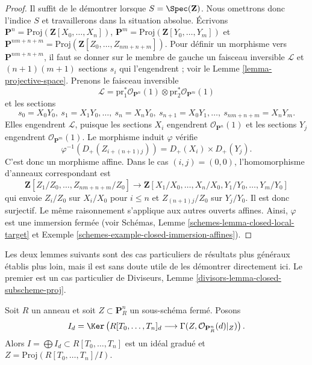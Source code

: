 \begin{proof}
Il suffit de le démontrer lorsque $S = \Spec(\mathbf{Z})$. Nous omettrons donc
l'indice $S$ et travaillerons dans la situation absolue. Écrivons
$\mathbf{P}^n = \text{Proj}(\mathbf{Z}[X_0, \ldots, X_n])$,
$\mathbf{P}^m = \text{Proj}(\mathbf{Z}[Y_0, \ldots, Y_m])$ et
$\mathbf{P}^{nm + n + m} =
\text{Proj}(\mathbf{Z}[Z_0, \ldots, Z_{nm + n + m}])$.
Pour définir un morphisme vers $\mathbf{P}^{nm + n + m}$, il faut se donner
sur le membre de gauche un faisceau inversible $\mathcal{L}$ et
$(n + 1)(m + 1)$ sections $s_i$ qui l'engendrent ; voir le
Lemme \ref{lemma-projective-space}. Prenons le faisceau inversible
$$
\mathcal{L} =
\text{pr}_1^*\mathcal{O}_{\mathbf{P}^n}(1)
\otimes
\text{pr}_2^*\mathcal{O}_{\mathbf{P}^m}(1)
$$
et les sections
$$
s_0 = X_0Y_0, \ s_1 = X_1Y_0, \ldots, \ s_n = X_nY_0,
\ s_{n + 1} = X_0Y_1, \ldots, \ s_{nm + n + m} = X_nY_m.
$$
Elles engendrent $\mathcal{L}$, puisque les sections $X_i$ engendrent
$\mathcal{O}_{\mathbf{P}^n}(1)$ et les sections $Y_j$ engendrent
$\mathcal{O}_{\mathbf{P}^m}(1)$. Le morphisme induit $\varphi$ vérifie
$$
\varphi^{-1}(D_{+}(Z_{i + (n + 1)j})) = D_{+}(X_i) \times D_{+}(Y_j).
$$
C'est donc un morphisme affine. Dans le cas $(i, j) = (0, 0)$,
l'homomorphisme d'anneaux correspondant est
$$
\mathbf{Z}[Z_1/Z_0, \ldots, Z_{nm + n + m}/Z_0]
\longrightarrow
\mathbf{Z}[X_1/X_0, \ldots, X_n/X_0, Y_1/Y_0, \ldots, Y_m/Y_0]
$$
qui envoie $Z_i/Z_0$ sur $X_i/X_0$ pour $i \leq n$ et
$Z_{(n + 1)j}/Z_0$ sur $Y_j/Y_0$. Il est donc surjectif. Le même raisonnement
s'applique aux autres ouverts affines. Ainsi, $\varphi$ est une immersion
fermée (voir Schémas, Lemme \ref{schemes-lemma-closed-local-target} et
Exemple \ref{schemes-example-closed-immersion-affines}).
\end{proof}

\noindent
Les deux lemmes suivants sont des cas particuliers de résultats plus généraux
établis plus loin, mais il est sans doute utile de les démontrer directement
ici. Le premier est un cas particulier de Diviseurs,
Lemme \ref{divisors-lemma-closed-subscheme-proj}.

\begin{lemma}
\label{lemma-closed-in-projective-space}
Soit $R$ un anneau et soit $Z \subset \mathbf{P}^n_R$ un sous-schéma fermé.
Posons
$$
I_d = \Ker\left(
R[T_0, \ldots, T_n]_d
\longrightarrow
\Gamma(Z, \mathcal{O}_{\mathbf{P}^n_R}(d)|_Z)\right).
$$
Alors $I = \bigoplus I_d \subset R[T_0, \ldots, T_n]$ est un idéal gradué et
$Z = \text{Proj}(R[T_0, \ldots, T_n]/I)$.
\end{lemma}

